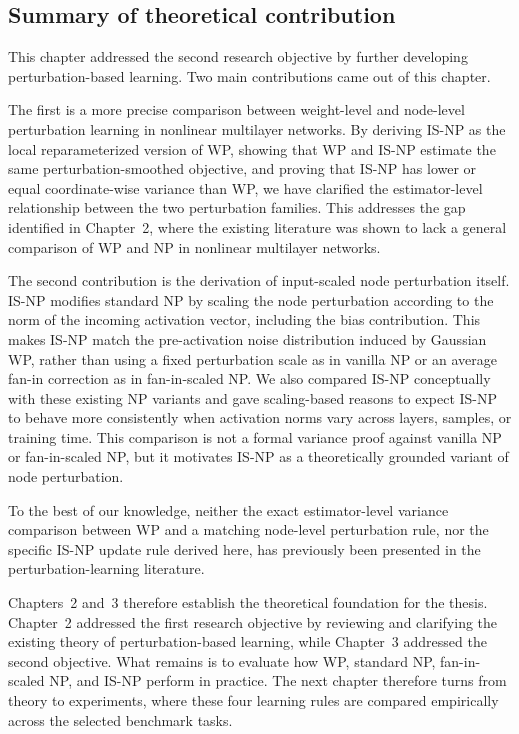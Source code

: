 \subsection{Summary of theoretical contribution}

This chapter addressed the second research objective by further developing perturbation-based learning. Two main contributions came out of this chapter. 

The first is a more precise comparison between weight-level and node-level perturbation learning in nonlinear multilayer networks. By deriving IS-NP as the local reparameterized version of WP, showing that WP and IS-NP estimate the same perturbation-smoothed objective, and proving that IS-NP has lower or equal coordinate-wise variance than WP, we have clarified the estimator-level relationship between the two perturbation families. This addresses the gap identified in Chapter~2, where the existing literature was shown to lack a general comparison of WP and NP in nonlinear multilayer networks.

The second contribution is the derivation of input-scaled node perturbation itself. IS-NP modifies standard NP by scaling the node perturbation according to the norm of the incoming activation vector, including the bias contribution. This makes IS-NP match the pre-activation noise distribution induced by Gaussian WP, rather than using a fixed perturbation scale as in vanilla NP or an average fan-in correction as in fan-in-scaled NP. We also compared IS-NP conceptually with these existing NP variants and gave scaling-based reasons to expect IS-NP to behave more consistently when activation norms vary across layers, samples, or training time. This comparison is not a formal variance proof against vanilla NP or fan-in-scaled NP, but it motivates IS-NP as a theoretically grounded variant of node perturbation.

To the best of our knowledge, neither the exact estimator-level variance comparison between WP and a matching node-level perturbation rule, nor the specific IS-NP update rule derived here, has previously been presented in the perturbation-learning literature.

Chapters~2 and~3 therefore establish the theoretical foundation for the thesis. Chapter~2 addressed the first research objective by reviewing and clarifying the existing theory of perturbation-based learning, while Chapter~3 addressed the second objective. What remains is to evaluate how WP, standard NP, fan-in-scaled NP, and IS-NP perform in
practice. The next chapter therefore turns from theory to experiments, where these four learning rules are compared empirically across the selected benchmark tasks.
